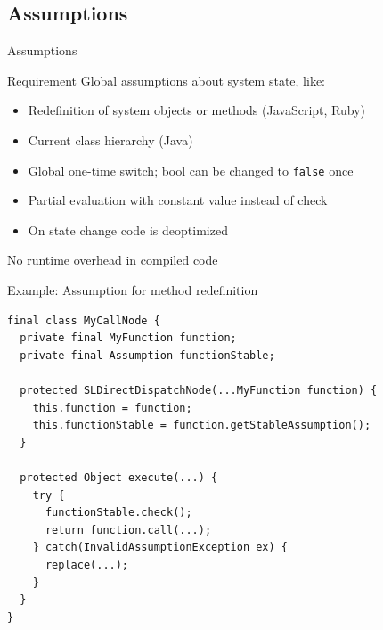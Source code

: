 \documentclass[xcolor=dvipsname,handout]{beamer} %
\begin{document}
\subsection{Assumptions}
\begin{frame}{Assumptions}
    \begin{alertblock}{Requirement}
        Global assumptions about system state, like:
        \begin{itemize}
          \item Redefinition of system objects or methods (JavaScript, Ruby)
          \item Current class hierarchy (Java)
        \end{itemize}
    \end{alertblock}
    \pause
    \vfill
    \begin{itemize}
        \item Global one-time switch; bool can be changed to \lstinline{false} once
        \pause
        \item Partial evaluation with constant value instead of check
        \pause
        \item On state change code is deoptimized
    \end{itemize}
    \pause
    \begin{center}
        \alert{No runtime overhead in compiled code}
    \end{center}
\end{frame}
\begin{frame}[fragile]{Example: Assumption for method redefinition}
  \begin{lstlisting}
final class MyCallNode {
  private final MyFunction function;
  private final Assumption functionStable;
  
  protected SLDirectDispatchNode(...MyFunction function) {
    this.function = function;
    this.functionStable = function.getStableAssumption();
  }

  protected Object execute(...) {
    try {
      functionStable.check();
      return function.call(...);
    } catch(InvalidAssumptionException ex) {
      replace(...);
    }
  }
}
  \end{lstlisting}
\end{frame}
\end{document}
